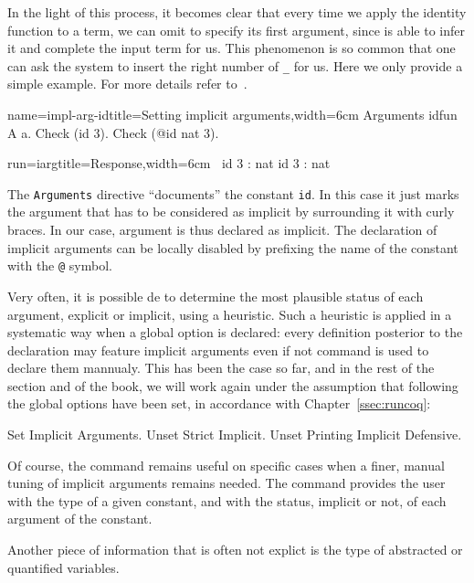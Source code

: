 In the light of this process, it becomes clear that every time we
apply the identity function to a term, we can omit to specify its
first argument, since \Coq{} is able to infer it and complete the
input term for us.  This phenomenon is so common that one can ask
the system to insert the right number of \lstinline/_/ for us. Here
we only provide a simple example. For more details
refer to~\cite[``Extensions of Gallina'']{Coq:manual}.  

\begin{coq-left}{name=impl-arg-id}{title=Setting implicit arguments,width=6cm}
Arguments idfun {A} a.
Check (id 3).
Check (@id nat 3).
\end{coq-left}
\begin{coqout-right}{run=iarg}{title=Response,width=6cm}
$~$
id 3 : nat
id 3 : nat
\end{coqout-right}

The \lstinline/Arguments/ directive ``documents'' the constant
\lstinline/id/.  In this case it just marks the argument that has to
be considered as implicit by surrounding it with curly braces. In our
case, argument  is thus declared as implicit.
The declaration of implicit arguments can be locally disabled by
prefixing the name of the constant with the \lstinline/@/ symbol.

Very often, it is possible de to determine the most plausible status
of each argument, explicit or implicit, using a heuristic. Such a
heuristic is applied in a systematic way when a global option is
declared: every definition posterior to the declaration may feature
implicit arguments even if not  command is used to declare
them mannualy. This has been the case so far, and in the rest of the
section and of the book, we will work again under the assumption that
following the global options have been set, in accordance with
Chapter~\ref{ssec:runcoq}:

\begin{coq}
Set Implicit Arguments.
Unset Strict Implicit.
Unset Printing Implicit Defensive.
\end{coq}

Of course, the  command remains useful on specific cases
when a finer, manual tuning of implicit arguments remains needed.
The command  provides the user with the type of
a given constant, and with the status, implicit or not, of each
argument of the constant.

Another piece of information that is often not explict is
the type of abstracted or quantified variables.

